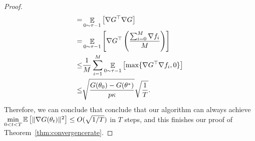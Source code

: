 \begin{proof}
\begin{align}
=& \EEsub{\nabla G^\top \nabla G}{0 \sim \tau-1}\\
=& \EEsub{\nabla G^\top \left( \frac{\sum_{i=0}^M \nabla f_i}{M} \right)}{0 \sim \tau-1}\\
\leq&  \frac{1}{M} \sum_{i=1}^M \EEsub{\max\{\nabla G^\top \nabla f_i, 0\}}{0 \sim \tau-1}\\
\leq&  \sqrt{\frac{G(\theta_0) - G(\theta^*)}{p \kappa}} \sqrt{\frac{1}{T}}.
\end{align}
Therefore, we can conclude that conclude that our algorithm can always achieve $\min \limits_{0 < t < T} \EE{\lVert
\nabla G(\theta_t)\rVert^2} \leq O(\sqrt{1/T})$ in $T$ steps, and this finishes our proof of
Theorem~\ref{thm:convergencerate}.
\end{proof}
